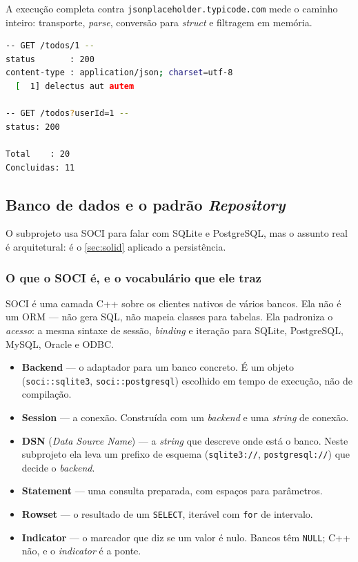 A execução completa contra \texttt{jsonplaceholder.typicode.com} mede o
caminho inteiro: transporte, \emph{parse}, conversão para \emph{struct} e
filtragem em memória.

\begin{lstlisting}[style=bt, language=bash,
    caption={Saída medida de \texttt{./dist/bin/http\_client}, demos 1 e 2.
             Vinte tarefas do usuário 1, onze concluídas.}]
-- GET /todos/1 --
status       : 200
content-type : application/json; charset=utf-8
  [  1] delectus aut autem

-- GET /todos?userId=1 --
status: 200

Total    : 20
Concluidas: 11
\end{lstlisting}

\subsection{Banco de dados e o padrão \emph{Repository}}
\label{sec:database}

O subprojeto  usa SOCI para falar com SQLite e PostgreSQL, mas
o assunto real é arquitetural: é o \cref{sec:solid} aplicado a persistência.

\subsubsection{O que o SOCI é, e o vocabulário que ele traz}

SOCI é uma camada C++ sobre os clientes nativos de vários bancos. Ela não é um
ORM --- não gera SQL, não mapeia classes para tabelas. Ela padroniza o
\emph{acesso}: a mesma sintaxe de sessão, \emph{binding} e iteração para SQLite,
PostgreSQL, MySQL, Oracle e ODBC.

\begin{itemize}
  \item \textbf{Backend} --- o adaptador para um banco concreto. É um objeto
        (\texttt{soci::sqlite3}, \texttt{soci::postgresql}) escolhido em tempo
        de execução, não de compilação.
  \item \textbf{Session} --- a conexão. Construída com um \emph{backend} e uma
        \emph{string} de conexão.
  \item \textbf{DSN} (\emph{Data Source Name}) --- a \emph{string} que descreve
        onde está o banco. Neste subprojeto ela leva um prefixo de esquema
        (\texttt{sqlite3://}, \texttt{postgresql://}) que decide o
        \emph{backend}.
  \item \textbf{Statement} --- uma consulta preparada, com espaços para
        parâmetros.
  \item \textbf{Rowset} --- o resultado de um \texttt{SELECT}, iterável com
        \texttt{for} de intervalo.
  \item \textbf{Indicator} --- o marcador que diz se um valor é nulo. Bancos
        têm \texttt{NULL}; C++ não, e o \emph{indicator} é a ponte.
\end{itemize}

